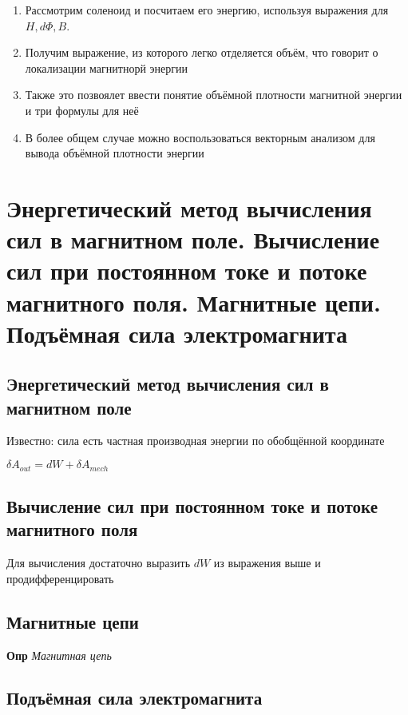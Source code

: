 \documentclass[a4paper, 14pt]{article}
\begin{document}
    \begin{enumerate}
        \item Рассмотрим соленоид и посчитаем его энергию, используя выражения для $H, d \Phi, B$.
        \item Получим выражение, из которого легко отделяется объём, что говорит о локализации магнитнорй энергии
        \item Также это позвоялет ввести понятие объёмной плотности магнитной энергии и три формулы для неё
        \item В более общем случае можно воспользоваться векторным анализом для вывода объёмной плотности энергии
    \end{enumerate}
    
    \section{Энергетический метод вычисления сил в магнитном поле.
    Вычисление сил при постоянном токе и потоке магнитного поля.
    Магнитные цепи.
    Подъёмная сила электромагнита}
    
    \subsection{Энергетический метод вычисления сил в магнитном поле}
    
    Известно: сила есть частная производная энергии по обобщённой координате
    
    $\delta A_{out} = dW + \delta A_{mech}$
    
    \subsection{Вычисление сил при постоянном токе и потоке магнитного поля}
    
    Для вычисления достаточно выразить $dW$ из выражения выше и продифференцировать
    
    \subsection{Магнитные цепи}
    
    \textbf{Опр} \textit{Магнитная цепь}
    
    \subsection{Подъёмная сила электромагнита}
    
\end{document}

